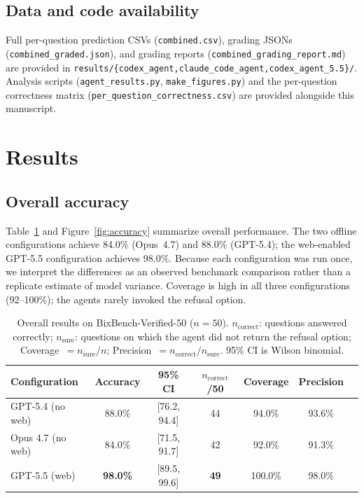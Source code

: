 \documentclass[11pt]{article}
\begin{document}
\subsection{Data and code availability}
Full per-question prediction CSVs (\texttt{combined.csv}), grading
JSONs (\texttt{combined\_graded.json}), and grading reports
(\texttt{combined\_grading\_report.md}) are provided in
\texttt{results/\{codex\_agent,claude\_code\_agent,codex\_agent\_5.5\}/}.
Analysis scripts (\texttt{agent\_results.py}, \texttt{make\_figures.py})
and the per-question correctness matrix
(\texttt{per\_question\_correctness.csv}) are provided alongside this
manuscript.

\section{Results}\label{sec:results}

\subsection{Overall accuracy}

Table~\ref{tab:overall} and Figure~\ref{fig:accuracy} summarize overall
performance. The two offline configurations achieve 84.0\% (Opus~4.7)
and 88.0\% (GPT-5.4); the web-enabled GPT-5.5 configuration achieves
98.0\%. Because each configuration was run once, we interpret the
differences as an observed benchmark comparison rather than a replicate
estimate of model variance. Coverage is high in all three configurations
(92--100\%); the agents rarely invoked the refusal option.

\begin{table}[ht]
\centering
\caption{Overall results on BixBench-Verified-50 ($n=50$).
$n_\text{correct}$: questions answered correctly; $n_\text{sure}$:
questions on which the agent did not return the refusal option;
Coverage~$=n_\text{sure}/n$; Precision~$=n_\text{correct}/n_\text{sure}$.
95\% CI is Wilson binomial.}
\label{tab:overall}
\begin{tabular}{lcccccc}
\toprule
Configuration       & Accuracy & 95\% CI         & $n_\text{correct}$/50 & Coverage & Precision \\
\midrule
GPT-5.4 (no web)    & 88.0\%   & [76.2, 94.4]    & 44                    & 94.0\%   & 93.6\% \\
Opus 4.7 (no web)   & 84.0\%   & [71.5, 91.7]    & 42                    & 92.0\%   & 91.3\% \\
GPT-5.5 (web)       & \textbf{98.0\%} & [89.5, 99.6] & \textbf{49}        & 100.0\%  & 98.0\% \\
\bottomrule
\end{tabular}
\end{table}
\end{document}
